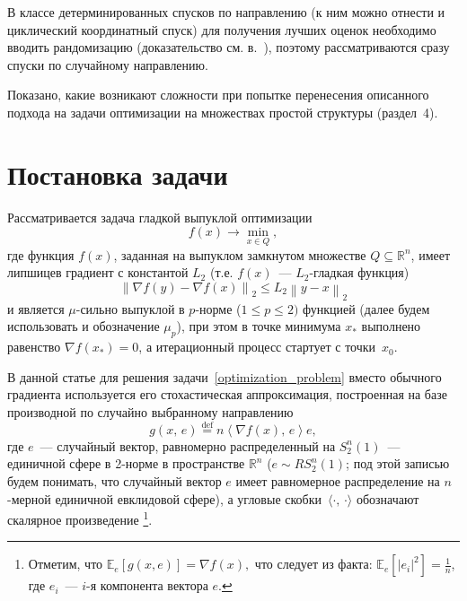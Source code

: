 \documentclass[11pt]{article}
\newcommand{\E}{\mathbb{E}}
\newcommand{\RR}{\mathbb{R}}
\begin{document}
	В классе детерминированных спусков по направлению (к ним можно отнести и циклический координатный спуск)
	для получения лучших оценок необходимо
	вводить рандомизацию (доказательство см. в.~\cite{Nest_coord_des}), поэтому
	рассматриваются сразу спуски по случайному направлению.
	
	
	Показано, какие возникают сложности при попытке перенесения описанного подхода на задачи оптимизации на множествах простой структуры (раздел~4). 
	

	
	\section{Постановка задачи}
	Рассматривается задача гладкой выпуклой оптимизации
	\begin{equation} \label{optimization_problem}
		f\left( x \right)\to \mathop {\min }\limits_{x\in Q},
	\end{equation}
	где функция $f\left( x \right)$, заданная на выпуклом замкнутом множестве $Q \subseteq \RR^n$, имеет липшицев градиент с 
	константой $L_2$ (т.е. $f(x)$~--- $L_2$-гладкая функция)
	\[
	\left\| {\nabla f\left( y \right)-\nabla f\left( x \right)} \right\|_2 \le 
	L_2 \left\| {y-x} \right\|_2
	\]
	и является $\mu $-сильно выпуклой в $p$-норме ($1\le p\le 2)$ функцией (далее будем использовать и обозначение $\mu_p$), при этом в точке минимума $x_*$ выполнено равенство $\nabla f\left( {x_\ast } \right)=0$, а итерационный процесс стартует с точки~$x_0$. 
	
	В данной статье для решения задачи~\eqref{optimization_problem} вместо обычного градиента используется его стохастическая
	аппроксимация, построенная на базе производной по случайно выбранному направлению 
    \cite{triangles-method}
	\[
	g\left( {x, \, e} \right)\overset{\text{def}}{=}n\left\langle {\nabla f\left( x \right), \, e} 
	\right\rangle e,
	\]
	где $e$~--- случайный вектор, равномерно распределенный на $S_2^n \left( 1 
	\right)$~--- единичной сфере в 2-норме в пространстве $\RR^n$ ($e \sim RS_2^n \left( 1 \right)$; под этой записью будем понимать, что случайный вектор $e$ имеет равномерное распределение на $n$-мерной единичной евклидовой сфере), а угловые скобки~$\langle\cdot, \, \cdot\rangle$ обозначают скалярное произведение \footnote{Отметим, что $\E_e[g(x,e)] = \nabla f(x),$ что следует из факта: $\E_e[|e_i|^2] = \frac{1}{n}$, где $e_i$~--- $i$-я компонента вектора $e$.}.
	
\end{document}
